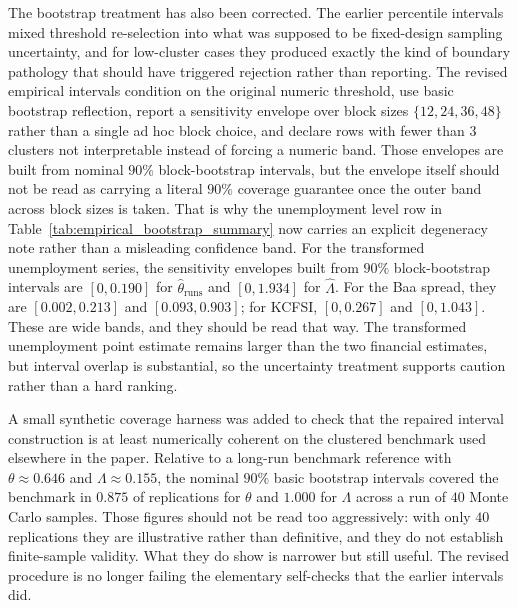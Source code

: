 \documentclass[11pt]{article}
\begin{document}
The bootstrap treatment has also been corrected. The earlier percentile intervals mixed threshold re-selection into what was supposed to be fixed-design sampling uncertainty, and for low-cluster cases they produced exactly the kind of boundary pathology that should have triggered rejection rather than reporting. The revised empirical intervals condition on the original numeric threshold, use basic bootstrap reflection, report a sensitivity envelope over block sizes $\{12,24,36,48\}$ rather than a single ad hoc block choice, and declare rows with fewer than $3$ clusters not interpretable instead of forcing a numeric band. Those envelopes are built from nominal $90\%$ block-bootstrap intervals, but the envelope itself should not be read as carrying a literal $90\%$ coverage guarantee once the outer band across block sizes is taken. That is why the unemployment level row in Table~\ref{tab:empirical_bootstrap_summary} now carries an explicit degeneracy note rather than a misleading confidence band. For the transformed unemployment series, the sensitivity envelopes built from $90\%$ block-bootstrap intervals are $[0, 0.190]$ for $\widehat{\theta}_{\mathrm{runs}}$ and $[0, 1.934]$ for $\widehat{\Lambda}$. For the Baa spread, they are $[0.002, 0.213]$ and $[0.093, 0.903]$; for KCFSI, $[0, 0.267]$ and $[0, 1.043]$. These are wide bands, and they should be read that way. The transformed unemployment point estimate remains larger than the two financial estimates, but interval overlap is substantial, so the uncertainty treatment supports caution rather than a hard ranking.

A small synthetic coverage harness was added to check that the repaired interval construction is at least numerically coherent on the clustered benchmark used elsewhere in the paper. Relative to a long-run benchmark reference with $\theta \approx 0.646$ and $\Lambda \approx 0.155$, the nominal $90\%$ basic bootstrap intervals covered the benchmark in $0.875$ of replications for $\theta$ and $1.000$ for $\Lambda$ across a run of $40$ Monte Carlo samples. Those figures should not be read too aggressively: with only $40$ replications they are illustrative rather than definitive, and they do not establish finite-sample validity. What they do show is narrower but still useful. The revised procedure is no longer failing the elementary self-checks that the earlier intervals did.
\end{document}
